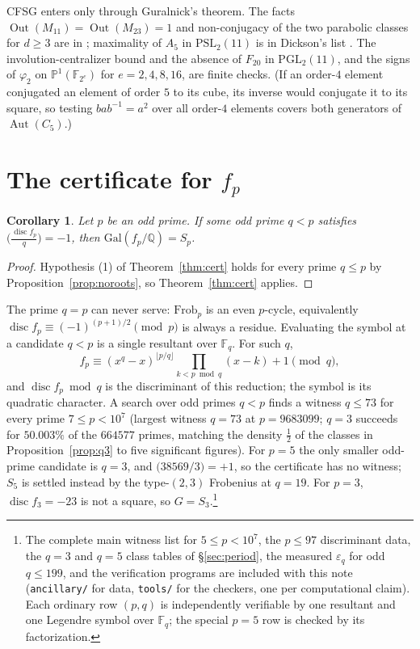 \documentclass[11pt,a4paper]{amsart}
\newcommand{\PSL}{\mathrm{PSL}}
\newcommand{\PGL}{\mathrm{PGL}}
\newcommand{\F}{\mathbb{F}}
\newcommand{\Q}{\mathbb{Q}}
\newcommand{\Gal}{\mathrm{Gal}}
\newcommand{\disc}{\operatorname{disc}}
\newcommand{\Frob}{\mathrm{Frob}}
\newcommand{\Out}{\operatorname{Out}}
\newcommand{\Aut}{\operatorname{Aut}}
\theoremstyle{plain}
\newtheorem{corollary}[theorem]{Corollary}
\theoremstyle{definition}
\begin{document}
CFSG enters only through Guralnick's theorem. The facts \(\Out(M_{11})=\Out(M_{23})=1\) and non-conjugacy of the two parabolic classes for \(d\ge3\) are in \cite{WilsonFSG}; maximality of \(A_5\) in \(\PSL_2(11)\) is in Dickson's list \cite[Hauptsatz~II.8.27]{Huppert}. The involution-centralizer bound and the absence of \(F_{20}\) in \(\PGL_2(11)\), and the signs of \(\varphi_2\) on \(\mathbb P^1(\F_{2^e})\) for \(e=2,4,8,16\), are finite checks. (If an order-\(4\) element conjugated an element of order \(5\) to its cube, its inverse would conjugate it to its square, so testing \(bab^{-1}=a^2\) over all order-\(4\) elements covers both generators of \(\Aut(C_5)\).)

\section{The certificate for \texorpdfstring{\(f_p\)}{f\_p}}
\label{sec:fp}

\begin{corollary}
\label{cor:fp}
Let \(p\) be an odd prime. If some odd prime \(q<p\) satisfies \(\bigl(\frac{\disc f_p}{q}\bigr)=-1\), then \(\Gal(f_p/\Q)=S_p\).
\end{corollary}

\begin{proof}
Hypothesis (1) of Theorem~\ref{thm:cert} holds for every prime \(q\le p\) by Proposition~\ref{prop:noroots}, so Theorem~\ref{thm:cert} applies.
\end{proof}

The prime \(q=p\) can never serve: \(\Frob_p\) is an even \(p\)-cycle, equivalently \(\disc f_p\equiv(-1)^{(p+1)/2}\pmod p\) is always a residue. Evaluating the symbol at a candidate \(q<p\) is a single resultant over \(\F_q\). For such \(q\),
\[
f_p\equiv(x^q-x)^{\lfloor p/q\rfloor}\prod_{k<p\bmod q}(x-k)+1\pmod q,
\]
and \(\disc f_p\bmod q\) is the discriminant of this reduction; the symbol is its quadratic character. A search over odd primes \(q<p\) finds a witness \(q\le73\) for every prime \(7\le p<10^7\) (largest witness \(q=73\) at \(p=9683099\); \(q=3\) succeeds for \(50.003\%\) of the \(664577\) primes, matching the density \(\tfrac12\) of the classes in Proposition~\ref{prop:q3} to five significant figures). For \(p=5\) the only smaller odd-prime candidate is \(q=3\), and \(\bigl(38569/3\bigr)=+1\), so the certificate has no witness; \(S_5\) is settled instead by the type-\((2,3)\) Frobenius at \(q=19\). For \(p=3\), \(\disc f_3=-23\) is not a square, so \(G=S_3\).\footnote{The complete main witness list for \(5\le p<10^7\), the \(p\le97\) discriminant data, the \(q=3\) and \(q=5\) class tables of \S\ref{sec:period}, the measured \(\varepsilon_q\) for odd \(q\le199\), and the verification programs are included with this note (\texttt{ancillary/} for data, \texttt{tools/} for the checkers, one per computational claim). Each ordinary row \((p,q)\) is independently verifiable by one resultant and one Legendre symbol over \(\F_q\); the special \(p=5\) row is checked by its factorization.}
\end{document}
